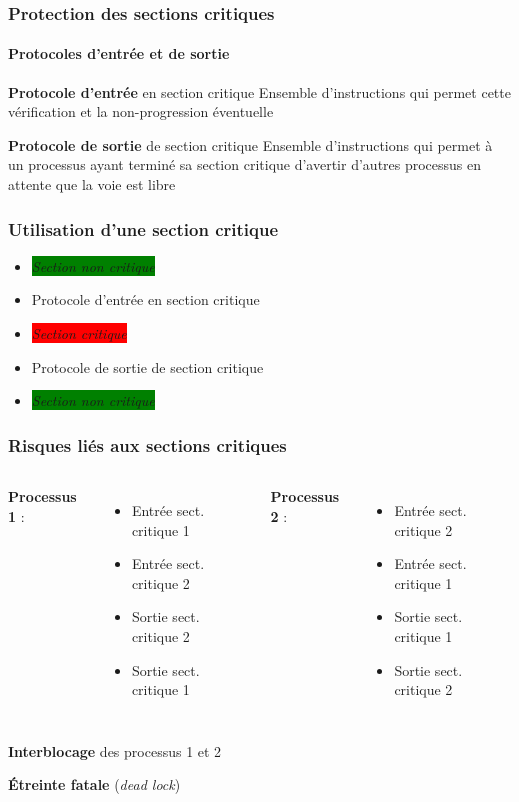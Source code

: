 \begin{frame}
\frametitle{Protection des sections critiques}
\framesubtitle{Protocoles d’entrée et de sortie}
\begin{block}{\textbf{Protocole d'entrée} en section critique}
Ensemble d'instructions qui permet cette vérification et la non-progression éventuelle
\end{block}
\begin{block}{\textbf{Protocole de sortie} de section critique}
Ensemble d'instructions qui permet à un processus ayant terminé sa section critique d'avertir d'autres processus en attente que la voie est libre
\end{block}
\end{frame}

\begin{frame}
\frametitle{Utilisation d’une section critique}
\begin{itemize}
\item \colorbox{green}{\textit{Section non critique}}
\item Protocole d'entrée en section critique
\item \colorbox{red}{\textit{Section critique}}
\item Protocole de sortie de section critique
\item \colorbox{green}{\textit{Section non critique}}
\end{itemize}
\end{frame}

\begin{frame}
\frametitle{Risques liés aux sections critiques}
\begin{columns}
\textbf{Processus 1} :
\begin{itemize}
\item Entrée sect. critique 1
\item Entrée sect. critique 2


\item Sortie sect. critique 2
\item Sortie sect. critique 1
\end{itemize}
\textbf{Processus 2} :
\begin{itemize}
\item Entrée sect. critique 2
\item Entrée sect. critique 1


\item Sortie sect. critique 1
\item Sortie sect. critique 2
\end{itemize}
\end{columns}
\begin{block}{}
\begin{center}
\textbf{Interblocage} des processus 1 et 2

\textbf{Étreinte fatale }(\textit{dead lock})
\end{center}
\end{block}
\end{frame}

